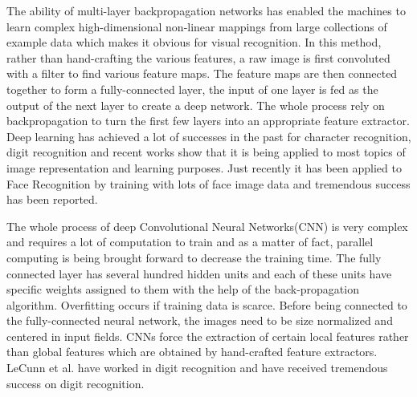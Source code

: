 The ability of multi-layer backpropagation networks has enabled the machines to learn complex high-dimensional non-linear mappings from large collections of example data which makes it obvious for visual recognition. In this method, rather than hand-crafting the various features, a raw image is first convoluted with a filter to find various feature maps. The feature maps are then connected together to form a fully-connected layer, the input of one layer is fed as the output of the next layer to create a deep network. The whole process rely on backpropagation to turn the first few layers into an appropriate feature extractor. Deep learning has achieved a lot of successes in the past for character recognition, digit recognition and recent works show that it is being applied to most topics of image representation and learning purposes. Just recently it has been applied to Face Recognition by training with lots of face image data and tremendous success has been reported.

The whole process of deep Convolutional Neural Networks(CNN)\cite{cnn} is very complex and requires a lot of computation to train and as a matter of fact, parallel computing is being brought forward to decrease the training time. The fully connected layer has several hundred hidden units and each of these units have specific weights assigned to them with the help of the back-propagation algorithm. Overfitting occurs if training data is scarce. Before being connected to the fully-connected neural network, the images need to be size normalized and centered in input fields. CNNs force the extraction of certain local features rather than global features which are obtained by hand-crafted feature extractors. LeCunn et al.\cite{lecun} have worked in digit recognition and have received tremendous success on digit recognition.

